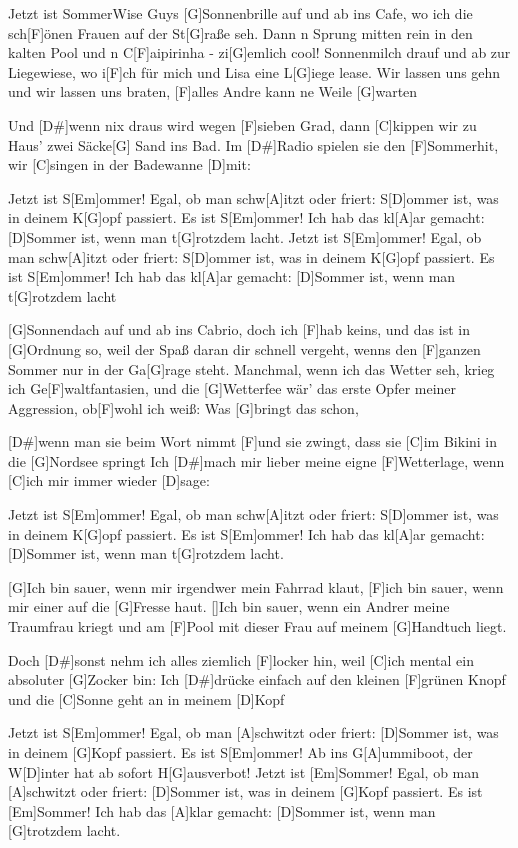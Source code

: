 \documentclass[../main.tex]{subfiles}
\begin{document}
\begin{song}{Jetzt ist Sommer}{Wise Guys}{}
[G]Sonnenbrille auf und ab ins Cafe, wo ich die sch[F]{ö}nen Frauen auf der St[G]raße seh.
Dann n Sprung mitten rein in den kalten Pool und n C[F]aipirinha - zi[G]emlich cool!
Sonnenmilch drauf und ab zur Liegewiese, wo i[F]ch für mich und Lisa eine L[G]iege lease.
Wir lassen uns gehn und wir lassen uns braten, [F]alles Andre kann ne Weile [G]warten

Und [D#]wenn nix draus wird wegen [F]sieben Grad, dann [C]kippen wir zu Haus' zwei Säcke[G] Sand ins Bad.
Im [D#]Radio spielen sie den [F]Sommerhit, wir [C]singen in der Badewanne [D]mit:

Jetzt ist S[Em]ommer! Egal, ob man schw[A]itzt oder friert: S[D]ommer ist, was in deinem K[G]opf passiert.
Es ist S[Em]ommer! Ich hab das kl[A]ar gemacht: [D]Sommer ist, wenn man t[G]rotzdem lacht.
Jetzt ist S[Em]ommer! Egal, ob man schw[A]itzt oder friert: S[D]ommer ist, was in deinem K[G]opf passiert.
Es ist S[Em]ommer! Ich hab das kl[A]ar gemacht: [D]Sommer ist, wenn man t[G]rotzdem lacht

[G]Sonnendach auf und ab ins Cabrio, doch ich [F]hab keins, und das ist in [G]Ordnung so,
weil der Spaß daran dir schnell vergeht, wenns den [F]ganzen Sommer nur in der Ga[G]rage steht.
Manchmal, wenn ich das Wetter seh, krieg ich Ge[F]waltfantasien, und die [G]Wetterfee
wär' das erste Opfer meiner Aggression, ob[F]wohl ich weiß: Was [G]bringt das schon,

[D#]wenn man sie beim Wort nimmt [F]und sie zwingt, dass sie [C]im Bikini in die [G]Nordsee springt
Ich [D#]mach mir lieber meine eigne [F]Wetterlage, wenn [C]ich mir immer wieder [D]sage:

Jetzt ist S[Em]ommer! Egal, ob man schw[A]itzt oder friert: S[D]ommer ist, was in deinem K[G]opf passiert.
Es ist S[Em]ommer! Ich hab das kl[A]ar gemacht: [D]Sommer ist, wenn man t[G]rotzdem lacht.

[G]Ich bin sauer, wenn mir irgendwer mein Fahrrad klaut, 
[F]ich bin sauer, wenn mir einer auf die [G]Fresse haut.
[]Ich bin sauer, wenn ein Andrer meine Traumfrau kriegt 
und am [F]Pool mit dieser Frau auf meinem [G]Handtuch liegt.

Doch [D#]sonst nehm ich alles ziemlich [F]locker hin, weil [C]ich mental ein absoluter [G]Zocker bin:
Ich [D#]drücke einfach auf den kleinen [F]grünen Knopf und die [C]Sonne geht an in meinem [D]Kopf

Jetzt ist S[Em]ommer! Egal, ob man [A]schwitzt oder friert: [D]Sommer ist, was in deinem [G]Kopf passiert.
Es ist S[Em]ommer! Ab ins G[A]ummiboot, der W[D]inter hat ab sofort H[G]ausverbot!
Jetzt ist [Em]Sommer! Egal, ob man [A]schwitzt oder friert: [D]Sommer ist, was in deinem [G]Kopf passiert.
Es ist [Em]Sommer! Ich hab das [A]klar gemacht: [D]Sommer ist, wenn man [G]trotzdem lacht.
\end{song}
\end{document}
